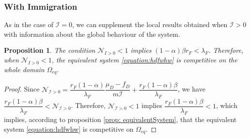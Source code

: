 \documentclass{article}
\newcommand{\lfw}{\lambda_{F}}
\newcommand{\lfw}{\lambda_{F}}
\newcommand{\cI}{\mathcal{I}}
\newtheorem{prop}[theorem]{Proposition}
\theoremstyle{definition}
\theoremstyle{remark}
\begin{document}
\subsubsection{With Immigration}

As in the case of $\cI = 0$, we can supplement the local results obtained when $\cI > 0$ with information about the global behaviour of the system. 

\begin{prop}
The condition $\mathcal{N}_{I > 0} < 1$ implies $(1-\alpha) \beta r_F < \lfw$. Therefore, when $\mathcal{N}_{I > 0} < 1$, the equivalent system \eqref{equation:hdfwhw} is competitive on the whole domain $\Omega_{eq}$.
\end{prop}

\begin{proof}
Since $\mathcal{N}_{\cI > 0} = \dfrac{r_F(1-\alpha)}{\lfw}\dfrac{\mu_D - f_D}{m \cI} + \dfrac{r_F(1-\alpha) \beta}{\lfw}$, we have $\dfrac{r_F(1-\alpha) \beta}{\lfw} < \mathcal{N}_{\cI > 0}$. Therefore, $\mathcal{N}_{\cI > 0} < 1$ implies $\dfrac{r_F(1-\alpha) \beta}{\lfw} < 1$, which implies, according to proposition \ref{prop: equivalentSystem}, that the equivalent system \eqref{equation:hdfwhw} is competitive on $\Omega_{eq}$.
\end{proof}
\end{document}
